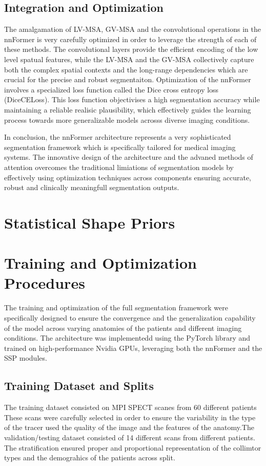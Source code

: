 \subsection{Integration and Optimization}
The amalgamation of LV-MSA, GV-MSA and the convolutional operations in the nnFormer is very carefully optimized in order to leverage the strength of each of these methods. The convolutional layers provide the efficient encoding of the low level spatual features, while the LV-MSA and the GV-MSA collectively capture both the complex spatial contexts and the long-range dependencies which are crucial for the precise and robust segmentaiton. Optimization of the nnFormer involves a specialized loss function called the Dice cross entropy loss (DiceCELoss). This loss function objectivises a high segmentation accuracy while maintaining a reliable realisic plausibility, which effectively guides the learning process towards more generalizable models acrosss diverse imaging conditions.


In conclusion, the nnFormer architecture represents a very sophisticated segmentation framework which is specifically tailored for medical imaging systems. The innovative design of the architecture and the advaned methods of attention overcomes the traditional limiations of segmentation models by effectively using optimization techniques across components ensuring accurate, robust and clinically meaningfull segmentation outputs.

\section{Statistical Shape Priors}


\section{Training and Optimization Procedures}
The training and optimization of the full segmentation framework were specifically designed to ensure the convergence and the generalization capability of the model across varying anatomies of the patients and different imaging conditions. The architecture was implementedd using the PyTorch library and trained on high-performance Nvidia GPUs, leveraging both the nnFormer and the SSP modules.

\subsection{Training Dataset and Splits}
The training dataset consisted on MPI SPECT scanes from 60 different patients These scans were carefully selected in order to ensure the variability in the type of the tracer used the quality of the image and the features of the anatomy.The validation/testing dataset consisted of 14 different scans from different patients. The stratification ensured proper and proportional representation of the collimtor types and the demograhics of the patients across split.

